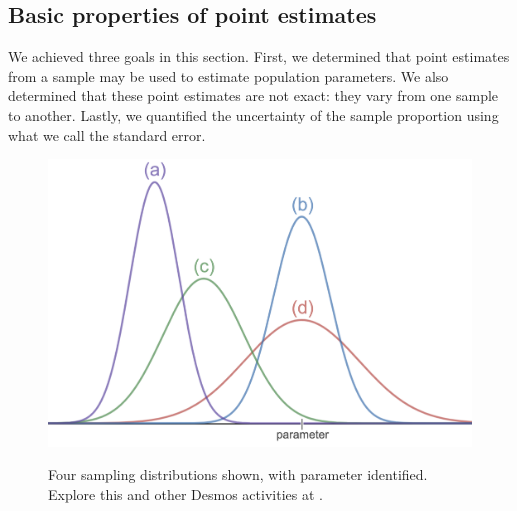\subsection{Basic properties of point estimates}

We achieved three goals in this section. First, we determined that point estimates from a sample may be used to estimate population parameters. We also determined that these point estimates are not exact: they vary from one sample to another. Lastly, we quantified the uncertainty of the sample proportion using what we  call the standard error. 

\begin{figure}
   \centering
\href{\oiRedirectUrl{desmos-foursamplingdistributions}}{
   \includegraphics[width=\textwidth]{ch_foundations_for_inf/figures/fourSamplingDistributions/fourSamplingDistributions}}
   \caption{Four sampling distributions shown, with parameter identified. \qquad  \qquad Explore this and other Desmos activities at .}
   \label{fourSamplingDistributions}
\end{figure}

